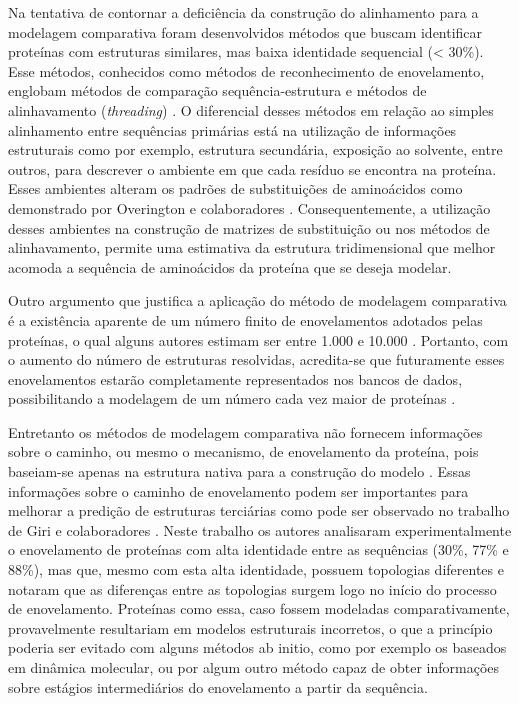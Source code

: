 Na tentativa de contornar a deficiência da construção do alinhamento para a modelagem comparativa foram desenvolvidos métodos que buscam identificar proteínas com estruturas similares, mas baixa identidade sequencial (< 30\%). Esse métodos, conhecidos como métodos de reconhecimento de enovelamento, englobam métodos de comparação sequência-estrutura e métodos de alinhavamento (\textit{threading}) \cite{Dunbrack2006}. O diferencial desses métodos em relação ao simples alinhamento entre sequências primárias está na utilização de informações estruturais como por exemplo, estrutura secundária, exposição ao solvente, entre outros, para descrever o ambiente em que cada resíduo se encontra na proteína. Esses ambientes alteram os padrões de substituições de aminoácidos como demonstrado por Overington e colaboradores \cite{Overington1990}. Consequentemente, a utilização desses ambientes na construção de matrizes de substituição ou nos métodos de alinhavamento, permite uma estimativa da estrutura tridimensional que melhor acomoda a sequência de aminoácidos da proteína que se deseja modelar.

Outro argumento que justifica a aplicação do método de modelagem comparativa é a existência aparente de um número finito de enovelamentos adotados pelas proteínas, o qual alguns autores estimam ser entre 1.000 e 10.000 \cite{Chothia1992a, Coulson2002}. Portanto, com o aumento do número de estruturas resolvidas, acredita-se que futuramente esses enovelamentos estarão completamente representados nos bancos de dados, possibilitando a modelagem de um número cada vez maior de proteínas \cite{Kolodny2013}.

Entretanto os métodos de modelagem comparativa não fornecem informações sobre o caminho, ou mesmo o mecanismo, de enovelamento da proteína, pois baseiam-se apenas na estrutura nativa para a construção do modelo \cite{Helles2008}. Essas informações sobre o caminho de enovelamento podem ser importantes para melhorar a predição de estruturas terciárias como pode ser observado no trabalho de Giri e colaboradores \cite{Giri2012}. Neste trabalho os autores analisaram experimentalmente o enovelamento de proteínas com alta identidade entre as sequências (30\%, 77\% e 88\%), mas que, mesmo com esta alta identidade, possuem topologias diferentes e notaram que as diferenças entre as topologias surgem logo no início do processo de enovelamento. Proteínas como essa, caso fossem modeladas comparativamente, provavelmente resultariam em modelos estruturais incorretos, o que a princípio poderia ser evitado com alguns métodos ab initio, como por exemplo os baseados em dinâmica molecular, ou por algum outro método capaz de obter informações sobre estágios intermediários do enovelamento a partir da sequência.

